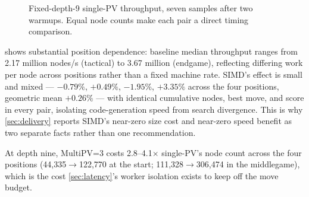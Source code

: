 \documentclass[10pt,twocolumn]{article}
\begin{document}
\begin{figure}[t]
\centering
{}
\caption{Fixed-depth-9 single-PV throughput, seven samples after two warmups.
Equal node counts make each pair a direct timing comparison.}
\label{fig:throughput}
\end{figure}

 shows substantial position dependence: baseline median
throughput ranges from 2.17 million nodes/s (tactical) to 3.67 million
(endgame), reflecting differing work per node across positions rather than a
fixed machine rate. SIMD's effect is small and mixed --- $-0.79\%$,
$+0.49\%$, $-1.95\%$, $+3.35\%$ across the four positions, geometric mean
$+0.26\%$ --- with identical cumulative nodes, best move, and score in every
pair, isolating code-generation speed from search divergence. This is why
\cref{sec:delivery} reports SIMD's near-zero size cost and near-zero speed
benefit as two separate facts rather than one recommendation.

At depth nine, MultiPV=3 costs 2.8--4.1$\times$ single-PV's node count across
the four positions (44,335$\to$122,770 at the start; 111,328$\to$306,474 in
the middlegame), which is the cost \cref{sec:latency}'s worker isolation
exists to keep off the move budget.
\end{document}

